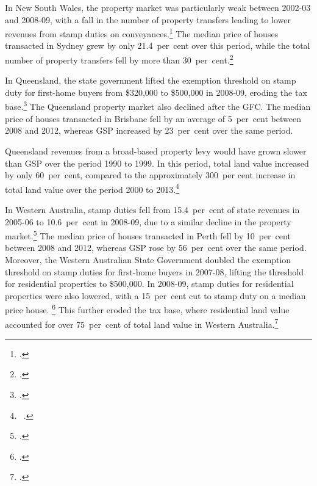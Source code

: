 \documentclass[twoside,english]{Dianab5ona4portrait}
\begin{document}
\begin{subappendices}
In New South Wales, the property market was particularly weak between 2002-03 and  2008-09, with a fall in the number of property transfers leading to lower revenues from stamp duties on conveyances.\footcite[][18]{CGC2009a}  The median price of houses transacted in Sydney grew by only 21.4~per~cent over this period, while the total number of property transfers fell by more than 30~per~cent.\footcite{ABS2015ResidentialPropertyIndex}  

In Queensland, the state government lifted the exemption threshold on stamp duty for first-home buyers from \$320,000 to \$500,000 in 2008-09, eroding the tax base.\footcite{TreasuryTradeQld2012}  The Queensland property market also declined after the GFC. The median price of houses transacted in Brisbane fell by an average of 5~per~cent between 2008 and 2012, whereas GSP increased by 23~per~cent over the same period.  

Queensland revenues from a broad-based property levy would have grown slower than GSP over the period 1990 to 1999. In this period, total land value increased by only 60~per~cent, compared to the approximately 300~per cent increase in total land value over the period 2000 to 2013.\footnote{\gao\ \textcite{ABS2014e}.}

In Western Australia, stamp duties fell from 15.4~per~cent of state revenues in 2005-06 to 10.6~per~cent in 2008-09, due to a similar decline in the property market.\footcite[][13]{CGC2010b}   The median price of houses transacted in Perth fell by 10~per~cent between 2008 and 2012, whereas GSP rose by 56~per~cent over the same period. Moreover, the Western Australian State Government doubled the exemption threshold on stamp duties for first-home buyers in 2007-08, lifting the threshold for residential properties to \$500,000.  In 2008-09, stamp duties for residential properties were also lowered, with a 15~per~cent cut to stamp duty on a median price house. \footcite{Treasury2007a}   This further eroded the tax base, where residential land value accounted for over 75~per~cent of total land value in Western Australia.\footcite{Treasury2008a}

\cleardoubleevenstandardpage
\newcommand{\propPhantomNotes}{
{\color{white}
\notes{‘Property levy’ shows the revenues that would have been raised with a broad-based property levy of 0.2~per~cent applied to unimproved land values had it been in place over the period.}

\source{\textcites{ABSmultipleyears}{ABS2014e}; Grattan analysis.}}
}


\end{subappendices}
\end{document}
